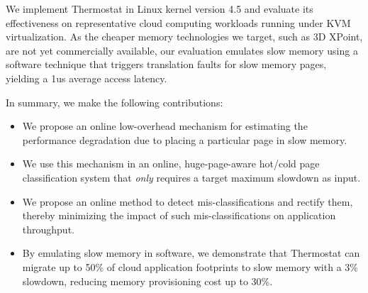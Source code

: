 We implement Thermostat in Linux kernel version 4.5 and evaluate its effectiveness on
representative cloud computing workloads running under KVM virtualization. 
As the cheaper memory technologies we target, such as 3D XPoint, are not yet commercially
available, our evaluation emulates slow memory using a software technique that triggers
translation faults for slow memory pages, yielding a 1us average
access latency.


In summary, we make the following contributions: 
\begin{itemize}
\item We propose an online low-overhead mechanism for
estimating the performance degradation due to placing a particular page
in slow memory.
\item We use this mechanism in an online, huge-page-aware hot/cold page
classification system that {\it only} requires a target maximum slowdown
as input.
\item We propose an online method to detect mis-classifications and rectify them,
thereby minimizing the impact of such mis-classifications on application
throughput.
\item By emulating slow memory in software, we demonstrate that Thermostat can
migrate up to 50\% of cloud application footprints to slow memory with
a 3\% slowdown, reducing memory provisioning cost up to 30\%.
\end{itemize}

